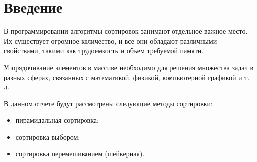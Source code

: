 \chapter*{Введение}

В программировании алгоритмы сортировок занимают отдельное важное место. Их существует огромное количество, и все они обладают различными свойствами, такими как трудоемкость и объем требуемой памяти.

Упорядочивание элементов в массиве необходимо для решения множества задач в разных сферах, связанных с математикой, физикой, компьютерной графикой и т. д.

В данном отчете будут рассмотрены следующие методы сортировки:
\begin{itemize}[label=---]
    \item пирамидальная сортировка;
    \item сортировка выбором;
    \item сортировка перемешиванием (шейкерная).
\end{itemize}

